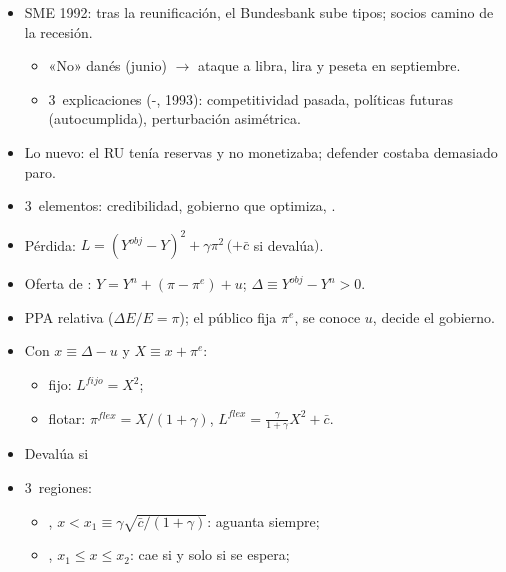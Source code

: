 \documentclass{article}
\begin{document}
\begin{columnas}
\begin{itemize}
\item SME 1992: tras la reunificación, el Bundesbank sube tipos; socios camino de la recesión.
  \begin{itemize}
  \item «No» danés (junio) $\to$ ataque a libra, lira y peseta en septiembre.
  \item 3~explicaciones (-, 1993): competitividad pasada, políticas futuras (autocumplida), perturbación asimétrica.
  \end{itemize}
\item Lo nuevo: el RU tenía reservas y no monetizaba; defender costaba demasiado paro.
\item 3~elementos: credibilidad, gobierno que optimiza, .
\end{itemize}
\begin{itemize}
\item Pérdida: $L=(Y^{obj}-Y)^2+\gamma\pi^2\,(+\bar c$ si devalúa$)$.
\item Oferta de : $Y=Y^n+(\pi-\pi^e)+u$; $\Delta\equiv Y^{obj}-Y^n>0$.
\item PPA relativa ($\Delta E/E=\pi$); el público fija $\pi^e$, se conoce $u$, decide el gobierno.
\end{itemize}
\begin{itemize}
\item Con $x\equiv\Delta-u$ y $X\equiv x+\pi^e$:
  \begin{itemize}
  \item fijo: $L^{fijo}=X^2$;
  \item flotar: $\pi^{flex}=X/(1+\gamma)$, $L^{flex}=\frac{\gamma}{1+\gamma}X^2+\bar c$.
  \end{itemize}
\item Devalúa si
\item 3~regiones:
  \begin{itemize}
  \item {}, $x<x_1\equiv\gamma\sqrt{\bar c/(1+\gamma)}$: aguanta siempre;
  \item {}, $x_1\le x\le x_2$: cae si y solo si se espera;

\end{itemize}
\end{itemize}
\end{columnas}
\end{document}

